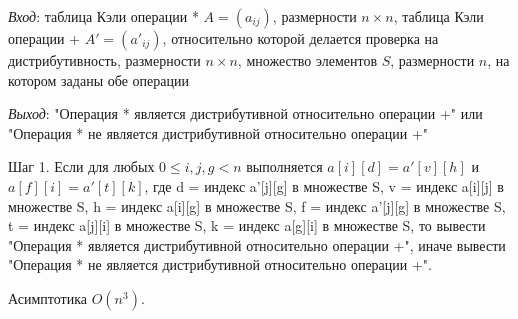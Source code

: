 \documentclass[spec, och, labwork]{shiza}
\begin{document}
\begin{enumerate}
                \textit{Вход}: таблица Кэли операции * $A = (a_{ij})$, размерности $n \times n$, таблица Кэли операции + $A' = (a'_{ij})$, относительно
                которой делается проверка на дистрибутивность, размерности $n \times n$, множество элементов $S$, размерности $n$, на котором заданы обе операции

                \textit{Выход}: "Операция * является дистрибутивной относительно операции +" или "Операция * не является дистрибутивной относительно операции +"

                Шаг 1. Если для любых $0 \leq i, j, g < n$ выполняется $a[i][d] = a'[v][h]$ и $a[f][i] = a'[t][k]$, 
                где d = индекс a'[j][g] в множестве S, v = индекс a[i][j] в множестве S, h = индекс a[i][g] в множестве 
                S, f = индекс a'[j][g] в множестве S, t = индекс a[j][i] в множестве S, k = индекс a[g][i] в множестве S,
                то вывести "Операция * является дистрибутивной относительно операции +", иначе вывести "Операция * не
                является дистрибутивной относительно операции +".

                Асимптотика $O(n^3)$.
            \end{enumerate}
\end{document}
